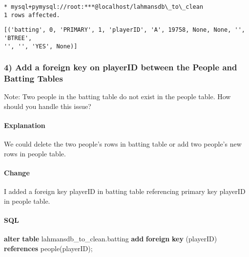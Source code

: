 \documentclass[11pt]{article}
\makeatletter
\newenvironment{Shaded}{}{}
\newcommand{\KeywordTok}[1]{\textcolor[rgb]{0.00,0.44,0.13}{\textbf{{#1}}}}
\newcommand{\NormalTok}[1]{{#1}}
\newcommand{\boxspacing}{\kern\kvtcb@left@rule\kern\kvtcb@boxsep}
\newcommand{\prompt}[4]{
        {\ttfamily\llap{{\color{#2}[#3]:\hspace{3pt}#4}}\vspace{-\baselineskip}}
    }
\makeatother
\begin{document}
    \begin{Verbatim}[commandchars=\\\{\}]
 * mysql+pymysql://root:***@localhost/lahmansdb\_to\_clean
1 rows affected.
    \end{Verbatim}

            \begin{tcolorbox}[breakable, size=fbox, boxrule=.5pt, pad at break*=1mm, opacityfill=0]
\prompt{Out}{outcolor}{19}{\boxspacing}
\begin{Verbatim}[commandchars=\\\{\}]
[('batting', 0, 'PRIMARY', 1, 'playerID', 'A', 19758, None, None, '', 'BTREE',
'', '', 'YES', None)]
\end{Verbatim}
\end{tcolorbox}
        
    \hypertarget{add-a-foreign-key-on-playerid-between-the-people-and-batting-tables}{%
\subsubsection{4) Add a foreign key on playerID between the People and
Batting
Tables}\label{add-a-foreign-key-on-playerid-between-the-people-and-batting-tables}}

Note: Two people in the batting table do not exist in the people table.
How should you handle this issue?

\hypertarget{explanation}{%
\paragraph{Explanation}\label{explanation}}

    We could delete the two people's rows in batting table or add two
people's new rows in people table.

    \hypertarget{change}{%
\paragraph{Change}\label{change}}

    I added a foreign key playerID in batting table referencing primary key
playerID in people table.

    \hypertarget{sql}{%
\paragraph{SQL}\label{sql}}

    \begin{Shaded}
\begin{Highlighting}[]
\KeywordTok{alter} \KeywordTok{table}\NormalTok{ lahmansdb\_to\_clean.batting}
\KeywordTok{add} \KeywordTok{foreign} \KeywordTok{key}\NormalTok{ (playerID) }\KeywordTok{references}\NormalTok{ people(playerID);}
\end{Highlighting}
\end{Shaded}
\end{document}
